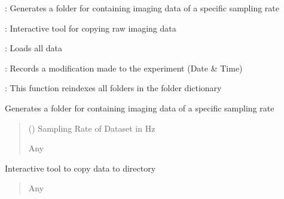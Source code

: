 \documentclass[letterpaper,10pt,english]{sphinxmanual}
\begin{document}
\begin{fulllineitems}
\begin{description}
\begin{DUlineblock}{0em}
\item[]  : Generates a folder for containing imaging data of a specific sampling rate
\item[]  : Interactive tool for copying raw imaging data
\item[]  : Loads all data
\item[]  :  Records a modification made to the experiment (Date \& Time)
\item[]  : This function re\sphinxhyphen{}indexes all folders in the folder dictionary
\end{DUlineblock}

\end{description}

\begin{fulllineitems}
\label{\detokenize{Organization:Organization.ImagingExperiment.add_image_sampling_folder}}
\pysigstartsignatures
{}
\pysigstopsignatures
\sphinxAtStartPar
Generates a folder for containing imaging data of a specific sampling rate
\begin{quote}\begin{description}
\sphinxAtStartPar
{} () \textendash{} Sampling Rate of Dataset in Hz

\sphinxAtStartPar
Any

\end{description}\end{quote}

\end{fulllineitems}


\begin{fulllineitems}
\label{\detokenize{Organization:Organization.ImagingExperiment.copy_data}}
\pysigstartsignatures
{}
\pysigstopsignatures
\sphinxAtStartPar
Interactive tool to copy data to directory
\begin{quote}\begin{description}
\sphinxAtStartPar
Any


\end{description}
\end{quote}
\end{fulllineitems}
\end{fulllineitems}
\end{document}
